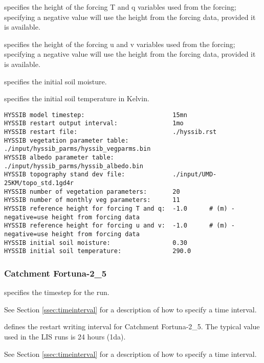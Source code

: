   specifies the
 height of the forcing T and q variables used from the forcing;
 specifying a negative value will use the height from the forcing
 data, provided it is available.

  specifies the
 height of the forcing u and v variables used from the forcing;
 specifying a negative value will use the height from the forcing
 data, provided it is available.

  specifies the
 initial soil moisture.

  specifies the
 initial soil temperature in Kelvin.
 

 \begin{Verbatim}[frame=single]
HYSSIB model timestep:                        15mn
HYSSIB restart output interval:               1mo
HYSSIB restart file:                          ./hyssib.rst
HYSSIB vegetation parameter table:            ./input/hyssib_parms/hyssib_vegparms.bin
HYSSIB albedo parameter table:                ./input/hyssib_parms/hyssib_albedo.bin
HYSSIB topography stand dev file:             ./input/UMD-25KM/topo_std.1gd4r
HYSSIB number of vegetation parameters:       20
HYSSIB number of monthly veg parameters:      11
HYSSIB reference height for forcing T and q:  -1.0      # (m) - negative=use height from forcing data
HYSSIB reference height for forcing u and v:  -1.0      # (m) - negative=use height from forcing data
HYSSIB initial soil moisture:                 0.30
HYSSIB initial soil temperature:              290.0
 \end{Verbatim}


 
 \subsubsection{Catchment Fortuna-2\_5} \label{sssec:lsm_clsmf25}
 

 
  specifies the timestep for the run.

 See Section \ref{ssec:timeinterval} for a description
 of how to specify a time interval.

  defines the restart
 writing  interval for Catchment Fortuna-2\_5. The typical
 value used in the LIS runs is 24 hours (1da).

 See Section \ref{ssec:timeinterval} for a description
 of how to specify a time interval.

